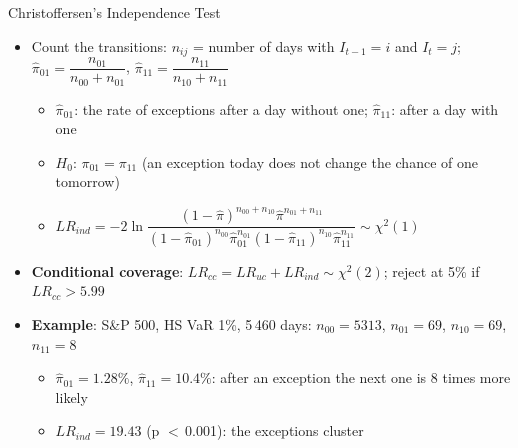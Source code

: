 \begin{frame}{Christoffersen's Independence Test}
\itemsize{\footnotesize}
\begin{itemize}
    \item Count the transitions: $n_{ij}$ = number of days with $I_{t-1} = i$ and $I_t = j$; $\hat\pi_{01} = \dfrac{n_{01}}{n_{00} + n_{01}}$, $\hat\pi_{11} = \dfrac{n_{11}}{n_{10} + n_{11}}$
    \begin{itemize}
        \item $\hat\pi_{01}$: the rate of exceptions after a day without one; $\hat\pi_{11}$: after a day with one
        \item $H_0$: $\pi_{01} = \pi_{11}$ (an exception today does not change the chance of one tomorrow) 
        \item $LR_{ind} = -2\ln\dfrac{(1 - \hat\pi)^{n_{00} + n_{10}}\hat\pi^{n_{01} + n_{11}}}{(1 - \hat\pi_{01})^{n_{00}}\hat\pi_{01}^{n_{01}}(1 - \hat\pi_{11})^{n_{10}}\hat\pi_{11}^{n_{11}}} \sim \chi^2(1)$
    \end{itemize}
    \item \textbf{Conditional coverage}: $LR_{cc} = LR_{uc} + LR_{ind} \sim \chi^2(2)$; reject at 5\% if $LR_{cc} > 5.99$
    \item \textbf{Example}: S\&P 500, HS VaR 1\%, 5\,460 days: $n_{00} = 5313$, $n_{01} = 69$, $n_{10} = 69$, $n_{11} = 8$
    \begin{itemize}
        \item $\hat\pi_{01} = 1.28\%$, $\hat\pi_{11} = 10.4\%$: after an exception the next one is 8 times more likely
        \item $LR_{ind} = 19.43$ (p $<$\,0.001): the exceptions cluster
    \end{itemize}
\end{itemize}
\end{frame}

